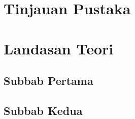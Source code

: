 

\section{Tinjauan Pustaka}


\section{Landasan Teori}

\subsection{Subbab Pertama}
\label{subsec:subbab-pertama}


\subsection{Subbab Kedua}
\label{subsec:subbab-kedua}

